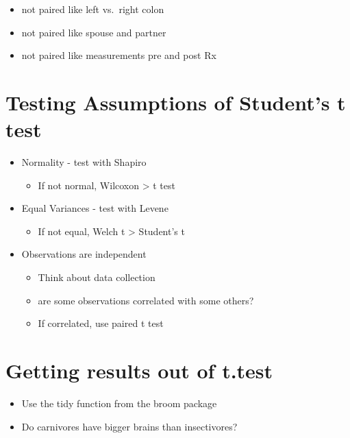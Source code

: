 \documentclass[
]{book}
\providecommand{\tightlist}{%
  \setlength{\itemsep}{0pt}\setlength{\parskip}{0pt}}
\begin{document}
\begin{itemize}
\tightlist
\item
  not paired like left vs.~right colon
\item
  not paired like spouse and partner
\item
  not paired like measurements pre and post Rx
\end{itemize}

\hypertarget{testing-assumptions-of-students-t-test}{%
\section{Testing Assumptions of Student's t test}\label{testing-assumptions-of-students-t-test}}

\begin{itemize}
\tightlist
\item
  Normality - test with Shapiro

  \begin{itemize}
  \tightlist
  \item
    If not normal, Wilcoxon \textgreater{} t test
  \end{itemize}
\item
  Equal Variances - test with Levene

  \begin{itemize}
  \tightlist
  \item
    If not equal, Welch t \textgreater{} Student's t
  \end{itemize}
\item
  Observations are independent

  \begin{itemize}
  \tightlist
  \item
    Think about data collection
  \item
    are some observations correlated with some others?
  \item
    If correlated, use paired t test
  \end{itemize}
\end{itemize}

\hypertarget{getting-results-out-of-t.test}{%
\section{Getting results out of t.test}\label{getting-results-out-of-t.test}}

\begin{itemize}
\tightlist
\item
  Use the tidy function from the broom package
\item
  Do carnivores have bigger brains than insectivores?
\end{itemize}
\end{document}

